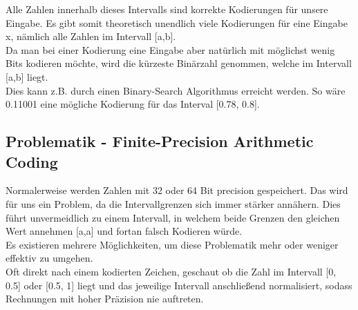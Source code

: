 \documentclass[a4paper]{article}
\theoremstyle{definition}
\theoremstyle{remark}
\begin{document}
Alle Zahlen innerhalb dieses Intervalls sind korrekte Kodierungen für unsere Eingabe. Es gibt somit theoretisch unendlich viele Kodierungen für eine Eingabe x, nämlich alle Zahlen im Intervall [a,b].\\
Da man bei einer Kodierung eine Eingabe aber natürlich mit möglichst wenig Bits kodieren möchte, wird die kürzeste Binärzahl genommen, welche im Intervall [a,b] liegt.\\
Dies kann z.B. durch einen Binary-Search Algorithmus erreicht werden. So wäre 0.11001 eine mögliche Kodierung für das Interval [0.78, 0.8].

\subsection{Problematik - Finite-Precision Arithmetic Coding}
\label{sec:Problematik}
Normalerweise werden Zahlen mit 32 oder 64 Bit precision gespeichert. Das wird für uns ein Problem, da die Intervallgrenzen sich immer stärker annähern. Dies führt unvermeidlich zu einem Intervall, in welchem beide Grenzen den gleichen Wert annehmen [a,a] und  fortan falsch Kodieren würde.\\
Es existieren mehrere Möglichkeiten, um diese Problematik mehr oder weniger effektiv zu umgehen.\\
Oft direkt nach einem kodierten Zeichen, geschaut ob die Zahl im Intervall [0, 0.5] oder [0.5, 1] liegt und das jeweilige Intervall anschließend normalisiert, sodass Rechnungen mit hoher Präzision nie auftreten.

\newpage
\end{document}

